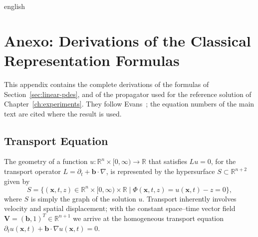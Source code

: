 
\begin{hyphenrules}{english}

\chapter{Anexo: Derivations of the Classical Representation Formulas}\label{app:classical}

This appendix contains the complete derivations of the formulas of Section~\ref{sec:linear-pdes}, and of
the propagator used for the reference solution of Chapter~\ref{ch:experiments}. They follow
Evans~\cite{evans2010}; the equation numbers of the main text are cited where the result is used.

\section{Transport Equation}\label{app-sec:transport}

The geometry of a function $u:\mathbb{R}^n\times[0,\infty)\to\mathbb{R}$ that satisfies $Lu=0$, for the transport
operator $L=\partial_t+\mathbf{b}\cdot\nabla$, is represented by the hypersurface $S\subset\mathbb{R}^{n+2}$ given by
\begin{equation}
  S=\{(\mathbf{x},t,z)\in\mathbb{R}^n\times[0,\infty)\times\mathbb{R} \mid \Phi(\mathbf{x},t,z)=u(\mathbf{x},t)-z=0\},
  \label{eq:transport-graph}
\end{equation}
where $S$ is simply the graph of the solution $u$. Transport inherently involves velocity and spatial
displacement; with the constant space--time vector field $\mathbf{V}=(\mathbf{b},1)^{T}\in\mathbb{R}^{n+1}$ we arrive at
the homogeneous transport equation $\partial_t u(\mathbf{x},t)+\mathbf{b}\cdot\nabla u(\mathbf{x},t)=0$.


\end{hyphenrules}
